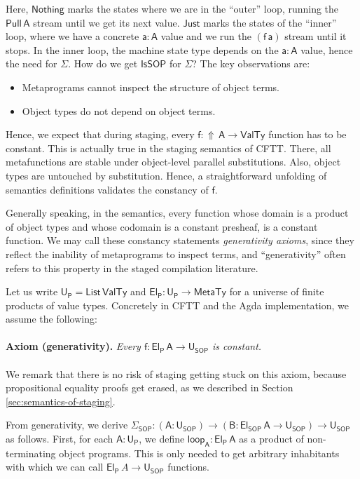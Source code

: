 \documentclass[acmsmall,screen,review,anonymous]{acmart}
\newcommand{\msf}[1]{{\mathsf{#1}}}
\newcommand{\vA}{\mathsf{A}}
\newcommand{\vB}{\mathsf{B}}
\newcommand{\va}{\mathsf{a}}
\newcommand{\vf}{\mathsf{f}}
\newcommand{\SOP}{\msf{SOP}}
\newcommand{\El}{\msf{El}}
\newcommand{\USOP}{\msf{U}_{\msf{SOP}}}
\newcommand{\Uprod}{\msf{U_P}}
\newcommand{\Elprod}{\msf{El_{P}}}
\newcommand{\IsSOP}{\msf{IsSOP}}
\newcommand{\List}{\msf{List}}
\newcommand{\Lift}{{\Uparrow}}
\newcommand{\MTy}{\msf{MetaTy}}
\newcommand{\VTy}{\msf{ValTy}}
\newcommand{\Nothing}{\msf{Nothing}}
\newcommand{\Just}{\msf{Just}}
\theoremstyle{remark}
\newcommand{\Pull}{\msf{Pull}}
\begin{document}
Here, $\Nothing$ marks the states where we are in the ``outer'' loop, running
the $\Pull\,\vA$ stream until we get its next value. $\Just$ marks the states of
the ``inner'' loop, where we have a concrete $\va : \vA$ value and we run the
$(\vf\,\va)$ stream until it stops. In the inner loop, the machine state type
depends on the $\va : \vA$ value, hence the need for $\Sigma$. How do we get
$\IsSOP$ for $\Sigma$? The key observations are:
\begin{itemize}
 \item Metaprograms cannot inspect the structure of object terms.
 \item Object types do not depend on object terms.
\end{itemize}
Hence, we expect that during staging, every $\vf : \Lift\,\vA \to \VTy$ function
has to be constant. This is actually true in the staging semantics of
CFTT. There, all metafunctions are stable under object-level parallel
substitutions. Also, object types are untouched by substitution. Hence, a
straightforward unfolding of semantics definitions validates the constancy of
$\vf$.

Generally speaking, in the semantics, every function whose domain is a product
of object types and whose codomain is a constant presheaf, is a constant
function. We may call these constancy statements \emph{generativity axioms},
since they reflect the inability of metaprograms to inspect terms, and
``generativity'' often refers to this property in the staged compilation
literature.

Let us write $\Uprod = \List\,\VTy$ and $\Elprod : \Uprod \to \MTy$ for a
universe of finite products of value types. Concretely in CFTT and the Agda
implementation, we assume the following:
\\\\
\noindent \textbf{Axiom (generativity).}\textit{ Every $\vf : \Elprod\,\vA \to \USOP$ is constant. }
\\\\
We remark that there is no risk of staging getting stuck on this axiom, because
propositional equality proofs get erased, as we described in Section
\ref{sec:semantics-of-staging}.


From generativity, we derive $\Sigma_\SOP : (\vA : \USOP) \to (\vB : \El_\SOP\,\vA \to \USOP)
\to \USOP$ as follows. First, for each $\vA : \Uprod$, we define $\msf{loop_{\vA}} :
\Elprod\,\vA$ as a product of non-terminating object programs. This is only needed
to get arbitrary inhabitants with which we can call $\Elprod\,A \to \USOP$
functions.
\end{document}
